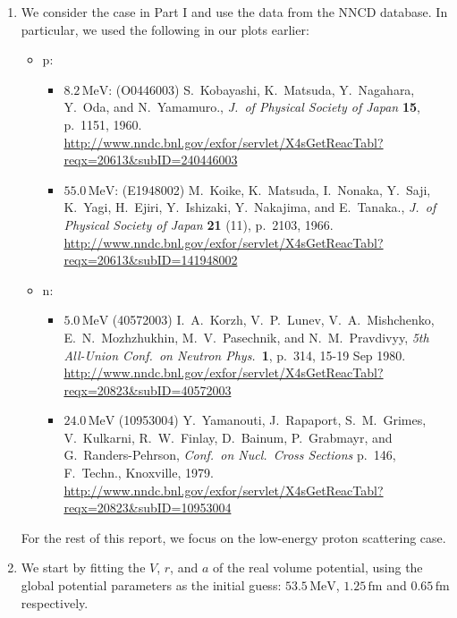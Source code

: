 \documentclass[fleqn, 12pt]{article}
\begin{document}
\begin{enumerate}

\item We consider the case in Part I and use the data from the NNCD database.
  In particular, we used the following in our plots earlier:

  \begin{itemize}
  \item p:
    \begin{itemize}
    \item $8.2\,\mathrm{MeV}$:
      (O0446003) S.\ Kobayashi, K.\ Matsuda, Y.\ Nagahara, Y.\ Oda, and N.\ Yamamuro.,
      \textit{J.\ of Physical Society of Japan} \textbf{15}, p.\ 1151, 1960.
      \url{http://www.nndc.bnl.gov/exfor/servlet/X4sGetReacTabl?reqx=20613&subID=240446003}
    \item $55.0\,\mathrm{MeV}$:
      (E1948002) M.\ Koike, K.\ Matsuda, I.\ Nonaka, Y.\ Saji, K.\ Yagi,
      H.\ Ejiri, Y.\ Ishizaki, Y.\ Nakajima, and E.\ Tanaka.,
      \textit{J.\ of Physical Society of Japan} \textbf{21} (11), p.\ 2103, 1966.
      \url{http://www.nndc.bnl.gov/exfor/servlet/X4sGetReacTabl?reqx=20613&subID=141948002}
    \end{itemize}
  \item n:
    \begin{itemize}
    \item $5.0\,\mathrm{MeV}$
      (40572003) I.\ A.\ Korzh, V.\ P.\ Lunev, V.\ A.\ Mishchenko,
      E.\ N.\ Mozhzhukhin, M.\ V.\ Pasechnik, and N.\ M.\ Pravdivyy,
      \textit{5th All-Union Conf.\ on Neutron Phys.}\ \textbf{1}, p.\ 314, 15-19 Sep 1980.
      \url{http://www.nndc.bnl.gov/exfor/servlet/X4sGetReacTabl?reqx=20823&subID=40572003}
    \item $24.0\,\mathrm{MeV}$
      (10953004) Y.\ Yamanouti, J.\ Rapaport, S.\ M.\ Grimes, V.\ Kulkarni,
      R.\ W.\ Finlay, D.\ Bainum, P.\ Grabmayr, and G.\ Randers-Pehrson,
      \textit{Conf.\ on Nucl.\ Cross Sections} p.\ 146, F.\ Techn., Knoxville, 1979.
      \url{http://www.nndc.bnl.gov/exfor/servlet/X4sGetReacTabl?reqx=20823&subID=10953004}
    \end{itemize}
  \end{itemize}

  For the rest of this report, we focus on the low-energy proton scattering case.

\item We start by fitting the $V$, $r$, and $a$ of the real volume potential,
  using the global potential parameters as the initial guess:
  $53.5\,\mathrm{MeV}$, $1.25\,\mathrm{fm}$ and $0.65\,\mathrm{fm}$
  respectively.


\end{enumerate}
\end{document}
